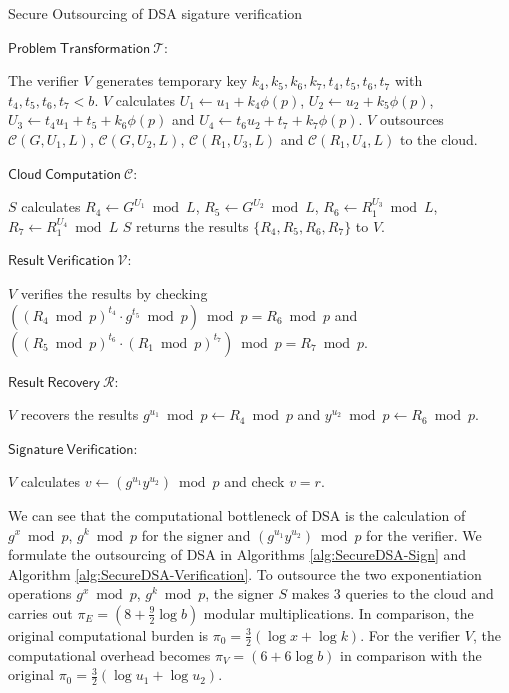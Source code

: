 \documentclass[english,draftcls,onecolumn,11pt]{IEEEtran}
\theoremstyle{definition}
\theoremstyle{plain}
\theoremstyle{plain}
\theoremstyle{definition}
\begin{document}
\begin{algorithm}[h] 
\caption{Secure Outsourcing of DSA sigature verification\label{alg:SecureDSA-Verification}}

\smallskip 
$\mathsf{Problem~Transformation}~\mathcal{T}$:  
\begin{algorithmic}[1] 
\STATE The verifier $V$ generates temporary key $k_4,k_5,k_6,k_7,t_4,t_5,t_6,t_7$ with $t_4,t_5,t_6,t_7<b$.
\STATE $V$ calculates $U_1\leftarrow u_1+k_4\phi(p)$, $U_2\leftarrow u_2+k_5\phi(p)$, $U_3\leftarrow t_4u_1+t_5+k_6\phi(p)$ and $U_4\leftarrow t_6u_2+t_7+k_7\phi(p)$. 
\STATE $V$ outsources $\mathcal{C}(G,U_1,L)$, $\mathcal{C}(G,U_2,L)$, $\mathcal{C}(R_1,U_3,L)$ and $\mathcal{C}(R_1,U_4,L)$ to the
cloud.
\end{algorithmic} 

\smallskip
$\mathsf{Cloud~Computation}~\mathcal{C}$:
\begin{algorithmic}[1] 
\STATE $S$ calculates $R_4\leftarrow G^{U_1}\bmod L$, $R_5\leftarrow G^{U_2}\bmod L$, $R_6\leftarrow R_1^{U_3}\bmod L$, $R_7\leftarrow R_1^{U_4}\bmod L$ 
\STATE $S$ returns the results $\{R_4,R_5,R_6,R_7\}$ to $V$.
\end{algorithmic} 

\smallskip
$\mathsf{Result~Verification}~\mathcal{V}$:
\begin{algorithmic}[1] 
\STATE $V$ verifies the results by checking $((R_4\bmod p)^{t_4}\cdot g^{t_5}\bmod p)\bmod p=R_6\bmod p$ and $((R_5\bmod p)^{t_6}\cdot(R_1\bmod p)^{t_7})\bmod p=R_7\bmod p$.
\end{algorithmic} 

\smallskip
$\mathsf{Result~Recovery}~\mathcal{R}$:
\begin{algorithmic}[1] 
\STATE $V$ recovers the results $g^{u_1}\bmod p\leftarrow R_4\bmod p$ and $y^{u_2}\bmod p\leftarrow R_6\bmod p$.
\end{algorithmic} 

\smallskip
$\mathsf{Signature~Verification}$: 
\begin{algorithmic}[1] 
\STATE $V$ calculates $v\leftarrow (g^{u_1}y^{u_2})\bmod p$ and check $v=r$.
\end{algorithmic}
\end{algorithm}

We can see that the computational bottleneck of DSA is the calculation
of $g^{x}\bmod p$, $g^{k}\bmod p$ for the signer and $(g^{u_{1}}y^{u_{2}})\bmod p$
for the verifier. We formulate the outsourcing of DSA in Algorithms
\ref{alg:SecureDSA-Sign} and Algorithm \ref{alg:SecureDSA-Verification}.
To outsource the two exponentiation operations $g^{x}\bmod p$, $g^{k}\bmod p$,
the signer $S$ makes $3$ queries to the cloud and carries out $\pi_{E}=(8+\frac{9}{2}\log b)$
modular multiplications. In comparison, the original computational
burden is $\pi_{0}=\frac{3}{2}(\log x+\log k)$. For the verifier
$V$, the computational overhead becomes $\pi_{V}=(6+6\log b)$ in
comparison with the original $\pi_{0}=\frac{3}{2}(\log u_{1}+\log u_{2})$. 
\end{document}
